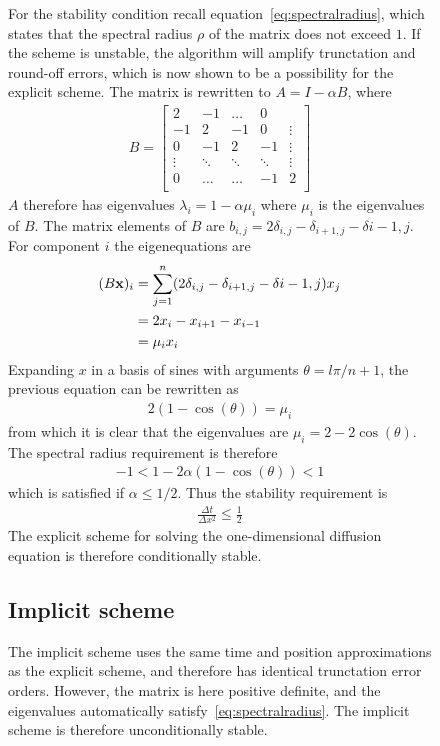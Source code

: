 \documentclass[aps,reprint]{revtex4-1}
\begin{document}
\begin{figure}[ht]
For the stability condition recall equation~\ref{eq:spectralradius}, which states
that the spectral radius $\rho$ of the matrix does not exceed $1$. If the scheme is
unstable, the algorithm will amplify trunctation and round-off errors, which is
now shown to be a possibility for the explicit scheme. The matrix
is rewritten to $A = I - \alpha B$, where
\begin{align*}
  B = \begin{bmatrix}
        2  & -1 & \hdots  & 0      \\
        -1 & 2  & -1 & 0       & \vdots \\
        0  & -1 & 2  & -1  & \vdots \\
        \vdots       & \ddots      & \ddots       & \ddots  & \vdots \\
        0  & \hdots  & \hdots       & -1  & 2 \\
      \end{bmatrix}
\end{align*}
$A$ therefore has eigenvalues $\lambda_i = 1 - \alpha \mu_i$ where $\mu_i$ is
the eigenvalues of $B$. The matrix elements of $B$ are $b_{i,j} = 2\delta_{i,j} - \delta_{i+1,j} - \delta{i-1,j}$.
For component $i$ the eigenequations are
\begin{align*}
  (B\vb{x})_i &= \sum_{j=1}^{n} (2\delta_{i,j} - \delta_{i+1,j} - \delta{i-1,j})x_j \\
              &= 2x_i - x_{i+1} - x_{i-1} \\
              &= \mu_i x_i
\end{align*}
Expanding $x$ in a basis of sines with arguments $\theta = l \pi / n + 1$, the previous equation can be rewritten as
\begin{align*}
  2(1 - \cos{(\theta)}) = \mu_i
\end{align*}
from which it is clear that the eigenvalues are $\mu_i = 2 - 2 \cos{(\theta)}$. The
spectral radius requirement is therefore
\begin{align*}
  -1 < 1 - 2 \alpha (1 - \cos{(\theta)}) < 1
\end{align*}
which is satisfied if $\alpha \leq 1/2$. Thus the stability requirement is
\begin{align}
  \frac{\Delta{t}}{\Delta{x^2}} \leq \frac{1}{2}
\end{align}
The explicit scheme for solving the one-dimensional diffusion equation is therefore
conditionally stable.

\subsection{Implicit scheme}
The implicit scheme uses the same time and position approximations as the explicit
scheme, and therefore has identical trunctation error orders. However, the matrix
is here positive definite, and the eigenvalues automatically satisfy~\ref{eq:spectralradius}.
The implicit scheme is therefore unconditionally stable.


\end{figure}
\end{document}
